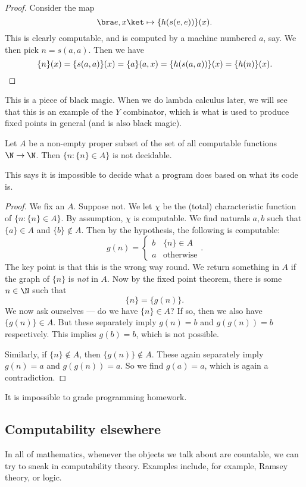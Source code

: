 \documentclass[a4paper]{article}
\begin{document}
\begin{proof}
  Consider the map
  \[
    \bra e, x\ket \mapsto \{h(s(e, e))\}(x).
  \]
  This is clearly computable, and is computed by a machine numbered $a$, say. We then pick $n = s(a, a)$. Then we have
  \[
    \{n\}(x) = \{s(a, a)\}(x) = \{a\}(a, x) = \{h(s(a, a))\}(x) = \{h(n)\}(x).\qedhere
  \]
\end{proof}
This is a piece of black magic. When we do lambda calculus later, we will see that this is an example of the $Y$ combinator, which is what is used to produce fixed points in general (and is also black magic).

\begin{thm}
  Let $A$ be a non-empty proper subset of the set of all computable functions $\N \to \N$. Then $\{n: \{n\} \in A\}$ is not decidable.
\end{thm}
This says it is impossible to decide what a program does based on what its code is.

\begin{proof}
  We fix an $A$. Suppose not. We let $\chi$ be the (total) characteristic function of $\{n: \{n\} \in A\}$. By assumption, $\chi$ is computable. We find naturals $a, b$ such that $\{a\} \in A$ and $\{b\} \not\in A$. Then by the hypothesis, the following is computable:
  \[
    g(n) =
    \begin{cases}
      b & \{n\} \in A\\
      a & \text{otherwise}
    \end{cases}.
  \]
  The key point is that this is the wrong way round. We return something in $A$ if the graph of $\{n\}$ is \emph{not} in $A$. Now by the fixed point theorem, there is some $n \in \N$ such that
  \[
    \{n\} = \{g(n)\}.
  \]
  We now ask ourselves --- do we have $\{n\} \in A$? If so, then we also have $\{g(n)\} \in A$. But these separately imply $g(n) = b$ and $g(g(n)) = b$ respectively. This implies $g(b) = b$, which is not possible.

  Similarly, if $\{n\} \not \in A$, then $\{g(n)\} \not \in A$. These again separately imply $g(n) = a$ and $g(g(n)) = a$. So we find $g(a) = a$, which is again a contradiction.
\end{proof}

\begin{cor}
  It is impossible to grade programming homework.
\end{cor}

\subsection{Computability elsewhere}
In all of mathematics, whenever the objects we talk about are countable, we can try to sneak in computability theory. Examples include, for example, Ramsey theory, or logic.
\end{document}

